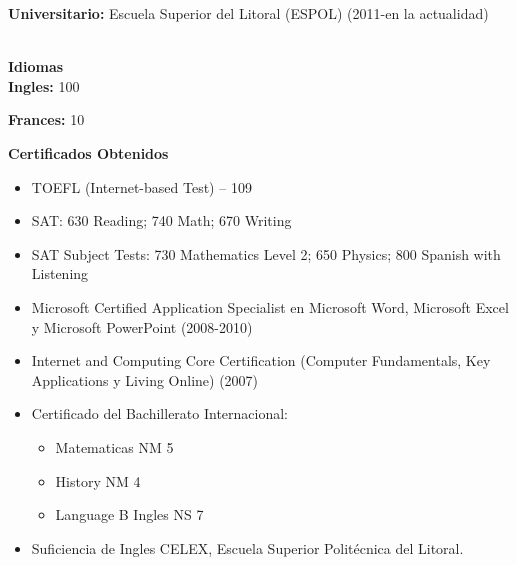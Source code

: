 \documentclass{article}
\newcommand{\tab}{\hspace*{2em}}
\begin{document}
	\tab{\tab{Bachiller en Ciencias}}

	\tab{\tab{Especializacion: Ingenieria (Fisico Matematico)}}

\textbf{Universitario:} Escuela Superior del Litoral (ESPOL) (2011-en la actualidad)

	\tab{\tab{Cursando 2do Año, en la Carrera de Ingenieria en Computacion}}\\

{\large\textbf{Idiomas}}\\

\textbf{Ingles:} 100%

	\tab{\tab{Finalizacion del curso de ingles del COPOL con los mas altos honores (2011)}}

\textbf{Frances:} 10%
 
\newpage

{\large\textbf{Certificados Obtenidos}}\\

\begin{itemize}
\item{TOEFL (Internet-based Test) – 109}

\item{SAT: 630 Reading; 740 Math; 670 Writing}

\item{SAT Subject Tests: 730 Mathematics Level 2; 650 Physics; 800 Spanish with Listening}

\item{Microsoft Certified Application Specialist en Microsoft Word, Microsoft Excel y Microsoft PowerPoint (2008-2010)}

\item{Internet and Computing Core Certification (Computer Fundamentals, Key Applications y Living Online) (2007)}

\item{Certificado del Bachillerato Internacional:}
 
\begin{itemize}
	\item{Matematicas NM 5}

	\item{History NM 4}

	\item{Language B Ingles NS 7}
\end{itemize}

\item{Suficiencia de Ingles CELEX, Escuela Superior Politécnica del Litoral.}\\
\end{itemize}
\end{document}
